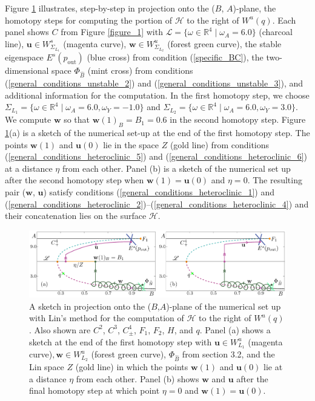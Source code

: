 \documentclass{ws-ijbc}
\begin{document}
Figure \ref{figure_10} illustrates, step-by-step in projection onto the ($B$, $A$)-plane, the homotopy steps for computing the portion of $\mathscr{H}$ to the right of $W^u(q)$.  
Each panel shows $C$ from Figure \ref{figure_1} with $\mathscr{L} = \{ \omega \in \mathbb{R}^4 \; | \; \omega_A = 6.0 \}$ (charcoal line), $\mathbf{u} \in W^s_{\Sigma_{L_1}}$ (magenta curve), $\mathbf{w} \in W^u_{\Sigma_{L_2}}$ (forest green curve), the stable eigenspace $E^s(p_{\text{out}})$ (blue cross) from condition (\ref{specific_BC}), the two-dimensional space $\Phi_{\widehat{B}}$ (mint cross) from conditions (\ref{general_conditions_unstable_2}) and (\ref{general_conditions_unstable_3}), and additional information for the computation.  
In the first homotopy step, we choose $\Sigma_{L_1}=\{ \omega \in \mathbb{R}^4 \; | \; \omega_A = 6.0, \omega_Y=-1.0 \}$ and $\Sigma_{L_2}=\{ \omega \in \mathbb{R}^4 \; | \; \omega_A = 6.0, \omega_Y=3.0 \}$.  We compute $\mathbf{w}$ so that $\mathbf{w}(1)_B = B_1 = 0.6$ in the second homotopy step.  Figure \ref{figure_10}(a) is a sketch of the numerical set-up at the end of the first homotopy step.  The points $\mathbf{w}(1)$ and $\mathbf{u}(0)$ lie in the space $Z$ (gold line) from conditions (\ref{general_conditions_heteroclinic_5}) and (\ref{general_conditions_heteroclinic_6}) at a distance $\eta$ from each other.  Panel (b) is a sketch of the numerical set up after the second homotopy step when $\mathbf{w}(1) = \mathbf{u}(0)$ and $\eta=0$.  The resulting pair ($\mathbf{w}$, $\mathbf{u}$) satisfy conditions (\ref{general_conditions_heteroclinic_1}) and (\ref{general_conditions_heteroclinic_2})--(\ref{general_conditions_heteroclinic_4}) and their concatenation lies on the surface $\mathscr{H}$.


\begin{figure}[H]
\centering
\includegraphics[]{./figures/MKMO_10.pdf}
\caption{A sketch in projection onto the ($B$,$A$)-plane of the numerical set up with Lin's method for the computation of $\mathscr{H}$ to the right of $W^u(q)$.  Also shown are $C^2$, $C^3$, $C^4_\pm$, $F_1$, $F_2$, $H$, and $q$.  Panel (a) shows a sketch at the end of the first homotopy step with $\mathbf{u} \in W^u_{L_1}$ (magenta curve)$, \mathbf{w} \in W^u_{L_2}$ (forest green curve), $\Phi_{\widehat{B}}$ from section 3.2, and the Lin space $Z$ (gold line) in which the points $\mathbf{w}(1)$ and $\mathbf{u}(0)$ lie at a distance $\eta$ from each other.  Panel (b) shows $\mathbf{w}$ and $\mathbf{u}$ after the final homotopy step at which point $\eta=0$ and $\mathbf{w}(1)=\mathbf{u}(0)$.}
\label{figure_10}
\end{figure}
\end{document}
